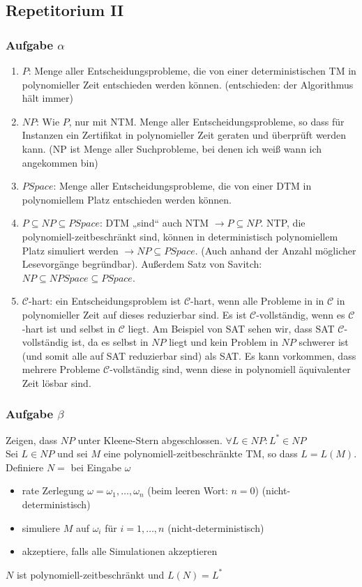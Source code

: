\subsection*{Repetitorium II}
\subsubsection*{Aufgabe $\alpha$}
    \begin{enumerate}
        \item $P$: Menge aller Entscheidungsprobleme, die von einer deterministischen TM in polynomieller Zeit entschieden werden können. (entschieden: der Algorithmus hält immer)
        \item $NP$: Wie $P$, nur mit NTM. Menge aller Entscheidungsprobleme, so dass für Instanzen ein Zertifikat in polynomieller Zeit geraten und überprüft werden kann. (NP ist Menge aller Suchprobleme, bei denen ich weiß wann ich angekommen bin)
        \item $PSpace$: Menge aller Entscheidungsprobleme, die von einer DTM in polynomiellem Platz entschieden werden können.
        \item $P \subseteq NP \subseteq PSpace$: DTM „sind“ auch NTM $\to P \subseteq NP$. NTP, die polynomiell-zeitbeschränkt sind, können in deterministisch polynomiellem Platz simuliert werden $\to NP \subseteq PSpace$. (Auch anhand der Anzahl möglicher Lesevorgänge begründbar). Außerdem Satz von Savitch: $NP \subseteq NPSpace \subseteq PSpace$.
        \item $\mathcal{C}$-hart: ein Entscheidungsproblem ist $\mathcal{C}$-hart, wenn alle Probleme in in $\mathcal{C}$ in polynomieller Zeit auf dieses reduzierbar sind. Es ist $\mathcal{C}$-vollständig, wenn es $\mathcal{C}$-hart ist und selbst in $\mathcal{C}$ liegt. Am Beispiel von SAT sehen wir, dass SAT $\mathcal{C}$-vollständig ist, da es selbst in $NP$ liegt und kein Problem in $NP$ schwerer ist (und somit alle auf SAT reduzierbar sind) als SAT. Es kann vorkommen, dass mehrere Probleme $\mathcal{C}$-vollständig sind, wenn diese in polynomiell äquivalenter Zeit lösbar sind.
    \end{enumerate}

\subsubsection*{Aufgabe $\beta$}
    Zeigen, dass $NP$ unter Kleene-Stern abgeschlossen. $\forall L \in \mathit{NP}: L^{*} \in \mathit{NP}$ \\
    Sei $L \in \mathit{NP}$ und sei $M$ eine polynomiell-zeitbeschränkte TM, so dass $L = L(M)$. \\
    Definiere $N = $ bei Eingabe $\omega$
    \begin{itemize}
        \item rate Zerlegung $\omega = \omega_{1},\dots,\omega_{n}$ (beim leeren Wort: $n=0$) (nicht-deterministisch)
        \item simuliere $M$ auf $\omega_{i}$ für $i = 1,\dots,n$ (nicht-deterministisch)
        \item akzeptiere, falls alle Simulationen akzeptieren
    \end{itemize}
    $N$ ist polynomiell-zeitbeschränkt und $L(N) = L^{*}$


